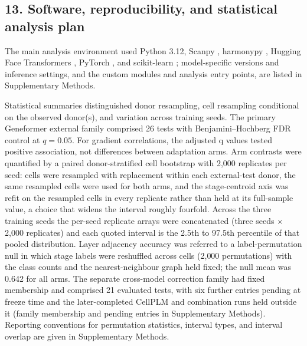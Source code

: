 \documentclass[12pt,letterpaper]{article}
\begin{document}
\subsection*{13. Software, reproducibility, and statistical analysis plan}

The main analysis environment used Python 3.12, Scanpy \cite{wolf2018scanpy}, harmonypy \cite{korsunsky2019,harmonypy}, Hugging Face Transformers \cite{wolf2020transformers}, PyTorch \cite{paszke2019}, and scikit-learn \cite{pedregosa2011}; model-specific versions and inference settings, and the custom modules and analysis entry points, are listed in Supplementary Methods.

Statistical summaries distinguished donor resampling, cell resampling conditional on the observed donor(s), and variation across training seeds. The primary Geneformer external family comprised 26 tests with Benjamini--Hochberg FDR control at $q=0.05$. For gradient correlations, the adjusted q values tested positive association, not differences between adaptation arms. Arm contrasts were quantified by a paired donor-stratified cell bootstrap with 2{,}000 replicates per seed: cells were resampled with replacement within each external-test donor, the same resampled cells were used for both arms, and the stage-centroid axis was refit on the resampled cells in every replicate rather than held at its full-sample value, a choice that widens the interval roughly fourfold. Across the three training seeds the per-seed replicate arrays were concatenated (three seeds $\times$ 2{,}000 replicates) and each quoted interval is the 2.5th to 97.5th percentile of that pooled distribution. Layer adjacency accuracy was referred to a label-permutation null in which stage labels were reshuffled across cells (2{,}000 permutations) with the class counts and the nearest-neighbour graph held fixed; the null mean was 0.642 for all arms. The separate cross-model correction family had fixed membership and comprised 21 evaluated tests, with six further entries pending at freeze time and the later-completed CellPLM and combination runs held outside it (family membership and pending entries in Supplementary Methods). Reporting conventions for permutation statistics, interval types, and interval overlap are given in Supplementary Methods.
\end{document}
